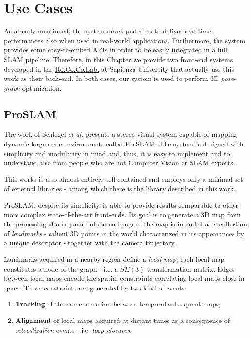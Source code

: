 \chapter{Use Cases}\label{ch:cases}
As already mentioned, the system developed aims to deliver real-time performances also when used in real-world applications. Furthermore, the system provides some easy-to-embed APIs in order to be easily integrated in a full SLAM pipeline. Therefore, in this Chapter we provide two front-end systems developed in the \hyperref{http://labrococo.dis.uniroma1.it/}{}{}{Ro.Co.Co.Lab.} at Sapienza University that actually use this work as their back-end. In both cases, our system is used to perform 3D \textit{pose-graph} optimization.

\section{ProSLAM}\label{sec:proslam}
The work of Schlegel \textit{et al.} \cite{schlegel2017proslam} presents a stereo-visual system capable of mapping dynamic large-scale environments called ProSLAM. The system is designed with simplicity and modularity in mind and, thus, it is easy to implement and to understand also from people who are not Computer Vision or SLAM experts.

This works is also almost entirely self-contained and employs only a minimal set of external libraries - among which there is the library described in this work.

ProSLAM, despite its simplicity, is able to provide results comparable to other more complex state-of-the-art front-ends. Its goal is to generate a 3D map from the processing of a sequence of stereo-images. The map is intended as a collection of \textit{landmarks} - salient 3D points in the world characterized in its appearances by a unique descriptor - together with the camera trajectory. 

Landmarks acquired in a nearby region define a \textit{local map}; each local map constitutes a node of the graph - i.e. a $SE(3)$ transformation matrix. Edges between local maps encode the spatial constraints correlating local maps close in space. Those constraints are generated by two kind of events:

\begin{enumerate}
    \item \textbf{Tracking} of the camera motion between temporal subsequent maps;
    \item \textbf{Alignment} of local maps acquired at distant times as a consequence of \textit{relocalization} events - i.e. \textit{loop-closures}.
\end{enumerate}

